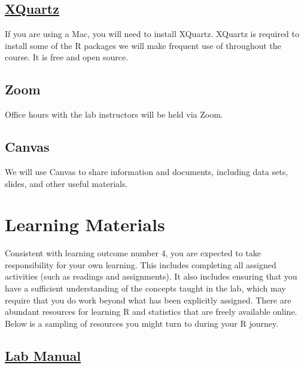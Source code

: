\documentclass[
]{book}
\begin{document}
\hypertarget{xquartz}{%
\subsection*{\texorpdfstring{\href{https://www.xquartz.org/}{XQuartz}}{XQuartz}}\label{xquartz}}

If you are using a Mac, you will need to install XQuartz. XQuartz is required to install some of the R packages we will make frequent use of throughout the course. It is free and open source.

\hypertarget{zoom}{%
\subsection*{Zoom}\label{zoom}}

Office hours with the lab instructors will be held via Zoom.

\hypertarget{canvas}{%
\subsection*{Canvas}\label{canvas}}

We will use Canvas to share information and documents, including data sets, slides, and other useful materials.

\hypertarget{learning-materials}{%
\section*{Learning Materials}\label{learning-materials}}

Consistent with learning outcome number 4, you are expected to take responsibility for your own learning. This includes completing all assigned activities (such as readings and assignments). It also includes ensuring that you have a sufficient understanding of the concepts taught in the lab, which may require that you do work beyond what has been explicitly assigned. There are abundant resources for learning R and statistics that are freely available online. Below is a sampling of resources you might turn to during your R journey.

\hypertarget{lab-manual}{%
\subsection*{\texorpdfstring{\href{https://zakarydraper.com/book}{Lab Manual}}{Lab Manual}}\label{lab-manual}}
\end{document}
